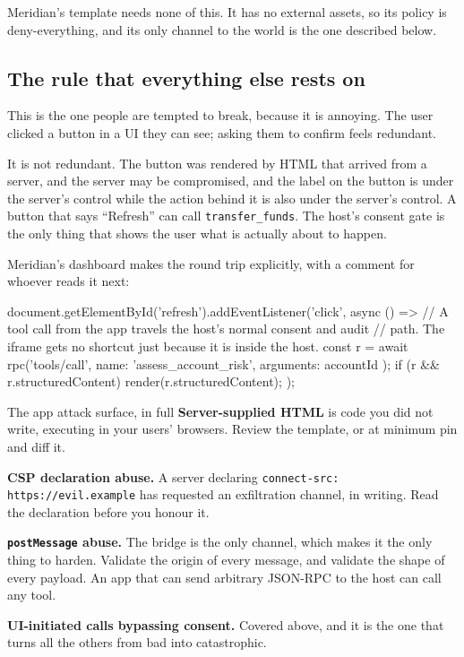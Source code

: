 Meridian's template needs none of this. It has no external assets, so its policy
is deny-everything, and its only channel to the world is the one described
below.

\subsection{The rule that everything else rests on}


This is the one people are tempted to break, because it is annoying. The user
clicked a button in a UI they can see; asking them to confirm feels redundant.

It is not redundant. The button was rendered by HTML that arrived from a server,
and the server may be compromised, and the label on the button is under the
server's control while the action behind it is also under the server's control.
A button that says ``Refresh'' can call \texttt{transfer\_funds}. The host's
consent gate is the only thing that shows the user what is actually about to
happen.

Meridian's dashboard makes the round trip explicitly, with a comment for whoever
reads it next:

\begin{ts}
document.getElementById('refresh').addEventListener('click', async () => {
  // A tool call from the app travels the host's normal consent and audit
  // path. The iframe gets no shortcut just because it is inside the host.
  const r = await rpc('tools/call',
    { name: 'assess_account_risk', arguments: { accountId } });
  if (r && r.structuredContent) render(r.structuredContent);
});
\end{ts}

\begin{dangerbox}{The app attack surface, in full}
\textbf{Server-supplied HTML} is code you did not write, executing in your
users' browsers. Review the template, or at minimum pin and diff it.

\textbf{CSP declaration abuse.} A server declaring
\texttt{connect-src: https://evil.example} has requested an exfiltration
channel, in writing. Read the declaration before you honour it.

\textbf{\texttt{postMessage} abuse.} The bridge is the only channel, which makes
it the only thing to harden. Validate the origin of every message, and validate
the shape of every payload. An app that can send arbitrary JSON-RPC to the host
can call any tool.

\textbf{UI-initiated calls bypassing consent.} Covered above, and it is the one
that turns all the others from bad into catastrophic.
\end{dangerbox}

